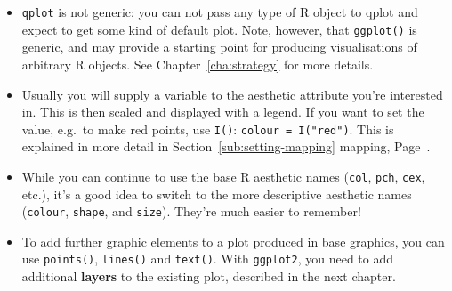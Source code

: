 \begin{itemize}
  \item {\tt qplot} is not generic: you can not pass any type of R object to qplot and expect to get some kind of default plot.  Note, however, that {\tt ggplot()} is generic, and may provide a starting point for producing visualisations of arbitrary R objects.  See Chapter~\ref{cha:strategy} for more details.
  
  \item Usually you will supply a variable to the aesthetic attribute you're interested in.  This is then scaled and displayed with a legend.  If you want to set the value, e.g.\ to make red points, use {\tt I()}: {\tt colour = I("red")}.  This is explained in more detail in Section~\ref{sub:setting-mapping} mapping, Page~\pageref{sub:setting-mapping}.
  
  \item While you can continue to use the base R aesthetic names ({\tt col},  {\tt pch}, {\tt cex}, etc.), it's a good idea to switch to the more descriptive \ggplot aesthetic names ({\tt colour}, {\tt shape}, and {\tt size}).  They're much easier to remember!

  \item To add further graphic elements to a plot produced in base graphics, you can use {\tt points()}, {\tt lines()} and {\tt text()}.  With {\tt ggplot2}, you need to add additional {\bf layers} to the existing plot, described in the next chapter.
  
\end{itemize}



